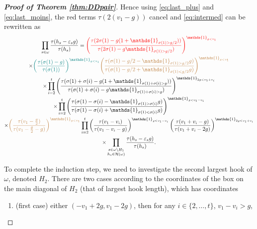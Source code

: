 \documentclass[11pt,letterpaper]{amsart}
\def\cch{\mathcal H}
\numberwithin{equation}{section}
\numberwithin{df}{section}
\begin{document}
\begin{proof}[\textbf{Proof of Theorem \ref{thm:DDpair}}]
Hence using \eqref{eq:last_plus} and \eqref{eq:last_moins}, the red terms $\tau(2(v_1-g))$ cancel and \eqref{eq:intermed} can be rewritten as
\begin{multline}\label{eq:last_eq_ind}
\prod_{s\in\omega}\frac{\tau(h_s-\varepsilon_s g)}{\tau(h_s)}=\textcolor{red}{\left(\frac{\tau(2\sigma(1)-g(1+\mathds{1}_{\sigma(1)>g/2}))}{\tau(2\sigma(1)-g\mathds{1}_{\sigma(1)>g/2})}\right)^{\mathds{1}_{g<v_1}}}
\\\times \textcolor{teal}{\left(\frac{\tau(\sigma(1)-g)}{\tau(\sigma(1))}\right)^{\mathds{1}_{g<v_1}}}
\textcolor{brown}{\left(\frac{\tau(\sigma(1)-g/2-\mathds{1}_{\sigma(1)>g/2}g)}{\tau(\sigma(1)-g/2+\mathds{1}_{\sigma(1)<g/2}g)}\right)^{\mathds{1}_{g<v_1}}}
\\ 
\times\prod_{i=2}^{t}\left(\frac{\tau(\sigma(1)+\sigma(i)-g(1+\mathds{1}_{\sigma(1)+\sigma(i)>g}))}{\tau(\sigma(1)+\sigma(i)-g\mathds{1}_{\sigma(1)+\sigma(i)>g})}\right)^{\mathds{1}_{2g<v_1+v_i}}\\
\times\prod_{i=2}^{t}\left(\frac{\tau(\sigma(1)-\sigma(i)-\mathds{1}_{\sigma(1)>\sigma(i)}g)}{\tau(\sigma(1)-\sigma(i)+\mathds{1}_{\sigma(1)<\sigma(i)}g)}\right)^{\mathds{1}_{g<v_1-v_i}}\\
\times\textcolor{brown}{\left(\frac{\tau(v_1-\frac{g}{2})}{\tau(v_1-\frac{g}{2}-g)}\right)^{\mathds{1}_{g<v_1}}}\prod_{i=2}^{t}\left(\frac{\tau(v_1-v_i)}{\tau(v_1-v_i-g)}\right)^{\mathds{1}_{g<v_1-v_i}}\left(\frac{\tau(v_1+v_i-g)}{\tau(v_1+v_i-2g)}\right)^{\mathds{1}_{2g<v_1+v_i}}
\\ 
\times\prod_{\substack{s\in\omega\setminus H_1\\h_s\in\cch(\omega)}}\frac{\tau(h_s-\varepsilon_s g)}{\tau(h_s)}.
\end{multline}

To complete the induction step, we need to investigate the second largest hook of $\omega$, denoted $H_2$. There are two cases according to the coordinates of the box on the main diagonal of $H_2$ (that of largest hook length), which has coordinates
\begin{enumerate}
\item (first case) either $(-v_1+2g,v_1-2g)$, then for any $i\in\lbrace 2,\dots, t\rbrace$, $v_1-v_i>g$,


\end{enumerate}
\end{proof}
\end{document}
